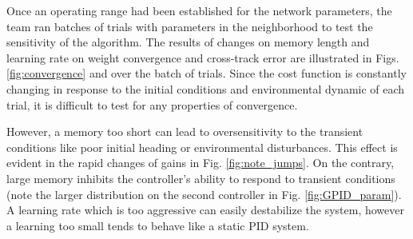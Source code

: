 \documentclass[conference]{IEEEtran}
\begin{document}
Once an operating range had been established for the network parameters, the team ran batches of trials with parameters in the neighborhood to test the sensitivity of the algorithm. The results of changes on memory length and learning rate on weight convergence and cross-track error are illustrated in Figs. \ref{fig:convergence} and  over the batch of trials. Since the cost function is constantly changing in response to the initial conditions and environmental dynamic of each trial, it is difficult to test for any properties of convergence. 

However, a memory too short can lead to oversensitivity to the transient conditions like poor initial heading or environmental disturbances. This effect is evident in the rapid changes of gains in Fig. \ref{fig:note_jumps}. On the contrary, large memory inhibits the controller's ability to respond to transient conditions (note the larger distribution on the second controller in Fig. \ref{fig:GPID_param}). A learning rate which is too aggressive can easily destabilize the system, however a learning too small tends to behave like a static PID system.
\end{document}
